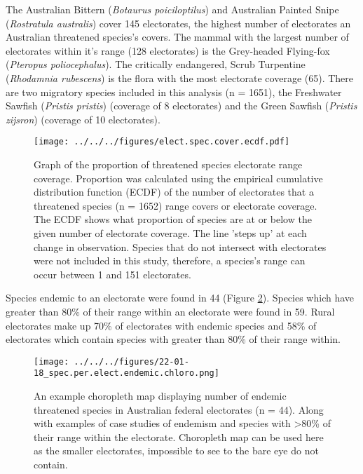 \documentclass[a4paper,11pt]{article}
\begin{document}
The Australian Bittern (\emph{Botaurus poiciloptilus}) and Australian Painted Snipe (\emph{Rostratula australis}) cover 145 electorates, the highest number of electorates an Australian threatened species's covers. The mammal with the largest number of electorates within it's range (128 electorates) is the Grey-headed Flying-fox (\emph{Pteropus poliocephalus}). The critically endangered, Scrub Turpentine (\emph{Rhodamnia rubescens}) is the flora with the most electorate coverage (65).
There are two migratory species included in this analysis (n = 1651), the Freshwater Sawfish (\emph{Pristis pristis}) (coverage of 8 electorates) and the Green Sawfish (\emph{Pristis zijsron}) (coverage of 10 electorates).


\begin{figure}[H]
	\centering
    \texttt{[image: ../../../figures/elect.spec.cover.ecdf.pdf]}
    \caption{Graph of the proportion of threatened species electorate range coverage. Proportion was calculated using the empirical cumulative distribution function (ECDF) of the number of electorates that a threatened species (n = 1652) range covers or electorate coverage. The ECDF shows what proportion of species are at or below the given number of electorate coverage. The line 'steps up' at each change in observation. Species that do not intersect with electorates were not included in this study, therefore, a species's range can occur between 1 and 151 electorates.}
    \label{fig:hist}
\end{figure}

Species endemic to an electorate were found in 44 (Figure \ref{fig:endemic_chloro}). Species which have greater than 80\% of their range within an electorate were found in 59. Rural electorates make up 70\% of electorates with endemic species and 58\% of electorates which contain species with greater than 80\% of their range within.

\begin{figure}[H]
	\centering
    \texttt{[image: ../../../figures/22-01-18\_spec.per.elect.endemic.chloro.png]}
    \caption{An example choropleth map displaying number of endemic threatened species in Australian federal electorates (n = 44). Along with examples of case studies of endemism and species with >80\% of their range within the electorate. Choropleth map can be used here as the smaller electorates, impossible to see to the bare eye do not contain.}
    \label{fig:endemic_chloro}
\end{figure}
\end{document}

